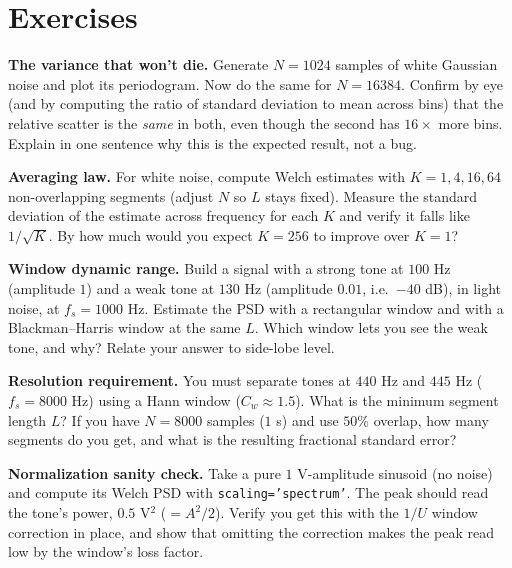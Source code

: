 \section{Exercises}
\label{ch21:exercises}

\begin{exercise}
\textbf{The variance that won't die.} Generate $N=1024$ samples of white Gaussian
noise and plot its periodogram. Now do the same for $N=16384$. Confirm by eye (and
by computing the ratio of standard deviation to mean across bins) that the relative
scatter is the \emph{same} in both, even though the second has $16\times$ more bins.
Explain in one sentence why this is the expected result, not a bug.
\end{exercise}

\begin{exercise}
\textbf{Averaging law.} For white noise, compute Welch estimates with $K=1,4,16,64$
non-overlapping segments (adjust $N$ so $L$ stays fixed). Measure the standard
deviation of the estimate across frequency for each $K$ and verify it falls like
$1/\sqrt{K}$. By how much would you expect $K=256$ to improve over $K=1$?
\end{exercise}

\begin{exercise}
\textbf{Window dynamic range.} Build a signal with a strong tone at $100$ Hz
(amplitude $1$) and a weak tone at $130$ Hz (amplitude $0.01$, i.e.\ $-40$ dB), in
light noise, at $f_s=1000$ Hz. Estimate the PSD with a rectangular window and with a
Blackman--Harris window at the same $L$. Which window lets you see the weak tone,
and why? Relate your answer to side-lobe level.
\end{exercise}

\begin{exercise}
\textbf{Resolution requirement.} You must separate tones at $440$ Hz and $445$ Hz
($f_s=8000$ Hz) using a Hann window ($C_w\approx 1.5$). What is the minimum segment
length $L$? If you have $N=8000$ samples ($1$ s) and use $50\%$ overlap, how many
segments do you get, and what is the resulting fractional standard error?
\end{exercise}

\begin{exercise}
\textbf{Normalization sanity check.} Take a pure $1$ V-amplitude sinusoid (no noise)
and compute its Welch PSD with \texttt{scaling='spectrum'}. The peak should read the
tone's power, $0.5$ V$^2$ ($=A^2/2$). Verify you get this with the $1/U$ window
correction in place, and show that omitting the correction makes the peak read low
by the window's loss factor.
\end{exercise}

